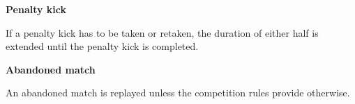 \bigskip

{\bfseries Penalty kick}

\headlinebox

If a penalty kick has to be taken or retaken, the duration of either half is extended until the penalty kick is completed.

\bigskip

{\sffamily
\textbf{Abandoned match} }

\headlinebox

An abandoned match is replayed unless the competition rules provide otherwise.

\bigskip

